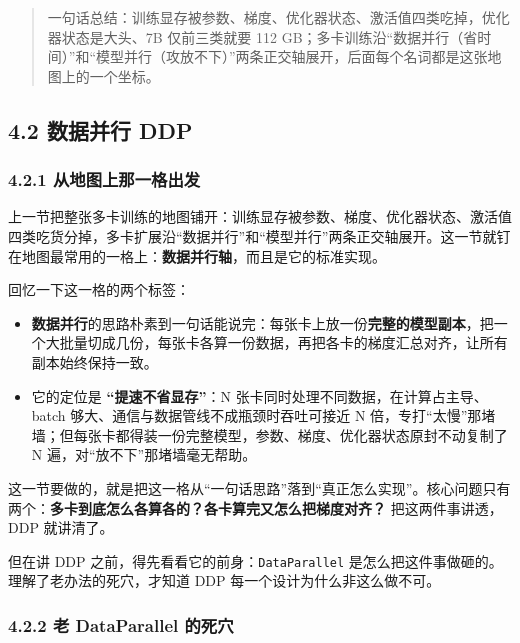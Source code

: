 \documentclass[
  chinese,
]{ctexart}
\providecommand{\tightlist}{%
  \setlength{\itemsep}{0pt}\setlength{\parskip}{0pt}}
\begin{document}
\begin{quote}
一句话总结：训练显存被参数、梯度、优化器状态、激活值四类吃掉，优化器状态是大头、7B
仅前三类就要 112
GB；多卡训练沿``数据并行（省时间）''和``模型并行（攻放不下）''两条正交轴展开，后面每个名词都是这张地图上的一个坐标。
\end{quote}

\subsection{4.2 数据并行 DDP}\label{ux6570ux636eux5e76ux884c-ddp}

\subsubsection{4.2.1
从地图上那一格出发}\label{ux4eceux5730ux56feux4e0aux90a3ux4e00ux683cux51faux53d1}

上一节把整张多卡训练的地图铺开：训练显存被参数、梯度、优化器状态、激活值四类吃货分掉，多卡扩展沿``数据并行''和``模型并行''两条正交轴展开。这一节就钉在地图最常用的一格上：\textbf{数据并行轴}，而且是它的标准实现。

回忆一下这一格的两个标签：

\begin{itemize}
\tightlist
\item
  \textbf{数据并行}的思路朴素到一句话能说完：每张卡上放一份\textbf{完整的模型副本}，把一个大批量切成几份，每张卡各算一份数据，再把各卡的梯度汇总对齐，让所有副本始终保持一致。
\item
  它的定位是 \textbf{``提速不省显存''}：N
  张卡同时处理不同数据，在计算占主导、batch
  够大、通信与数据管线不成瓶颈时吞吐可接近 N
  倍，专打``太慢''那堵墙；但每张卡都得装一份完整模型，参数、梯度、优化器状态原封不动复制了
  N 遍，对``放不下''那堵墙毫无帮助。
\end{itemize}

这一节要做的，就是把这一格从``一句话思路''落到``真正怎么实现''。核心问题只有两个：\textbf{多卡到底怎么各算各的？各卡算完又怎么把梯度对齐？}
把这两件事讲透，DDP 就讲清了。

但在讲 DDP 之前，得先看看它的前身：\texttt{DataParallel}
是怎么把这件事做砸的。理解了老办法的死穴，才知道 DDP
每一个设计为什么非这么做不可。

\subsubsection{4.2.2 老 DataParallel
的死穴}\label{ux8001-dataparallel-ux7684ux6b7bux7a74}
\end{document}
